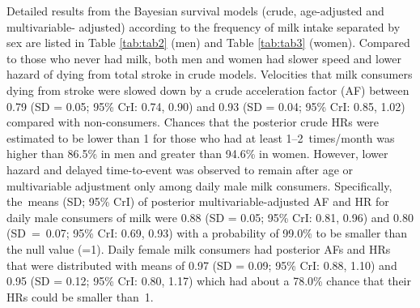\documentclass[nutrients,article,accept,moreauthors,pdftex]{Definitions/mdpi}
\begin{document}
Detailed results from the Bayesian survival models (crude, age-adjusted
and multivariable- adjusted) according to the frequency of milk intake
separated by sex are listed in {Table \ref{tab:tab2}} (men) and
{Table \ref{tab:tab3}} (women). Compared to those who never had
milk, both men and women had slower speed and lower hazard of dying from
total stroke in crude models. Velocities that milk consumers dying from
stroke were slowed down by a crude acceleration factor (AF) between 0.79
(SD = 0.05; 95\% CrI: 0.74, 0.90) and 0.93 (SD = 0.04; 95\% CrI: 0.85,
1.02) compared with non-consumers. Chances that the posterior crude HRs were estimated to be lower than 1 for those who had at least 1--2~times/month was higher than 86.5\%
in men and greater than 94.6\% in women. However, lower hazard and
delayed time-to-event was observed to remain after age or multivariable
adjustment only among daily male milk consumers. Specifically, the~means
(SD; 95\% CrI) of posterior multivariable-adjusted AF and HR for daily
male consumers of milk were 0.88 (SD = 0.05; 95\% CrI: 0.81, 0.96) and
0.80 (\mbox{SD = 0.07;} 95\% CrI: 0.69, 0.93) with a probability of 99.0\% to
be smaller than the null value (=1). Daily female milk consumers had
posterior AFs and HRs that were distributed with means of 0.97 (SD =
0.09; 95\% CrI: 0.88, 1.10) and 0.95 (SD = 0.12; 95\% CrI: 0.80, 1.17)
which had about a 78.0\% chance that their HRs could be smaller than~1.
\end{document}
